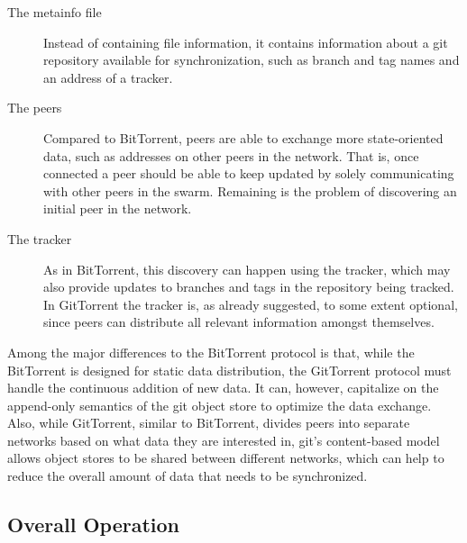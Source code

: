 \begin{description}

\item[The metainfo file]
%
	Instead of containing file information, it contains information
	about a git repository available for synchronization, such as
	branch and tag names and an address of a tracker.

\item[The peers]
%
	Compared to BitTorrent, peers are able to exchange more
	state-oriented data, such as addresses on other peers in the
	network. That is, once connected a peer should be able to keep
	updated by solely communicating with other peers in the
	swarm. Remaining is the problem of discovering an
	initial peer in the network.

\item[The tracker]
%
	As in BitTorrent, this discovery can happen using the tracker,
	which may also provide updates to branches and tags in the
	repository being tracked.  In GitTorrent the tracker is, as
	already suggested, to some extent optional, since peers
	can distribute all relevant information amongst themselves.

\end{description}

Among the major differences to the BitTorrent protocol is that, while
the BitTorrent is designed for static data distribution, the
GitTorrent protocol must handle the continuous addition of new data.
It can, however, capitalize on the append-only semantics of the git
object store to optimize the data exchange. Also, while GitTorrent,
similar to BitTorrent, divides peers into separate networks based on
what data they are interested in, git's content-based model allows
object stores to be shared between different networks, which can help
to reduce the overall amount of data that needs to be synchronized.

\subsection{Overall Operation}

%  
%  

